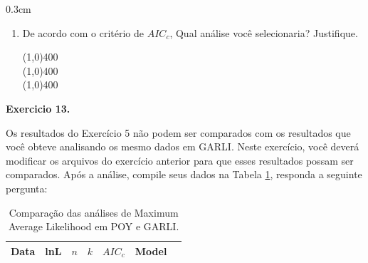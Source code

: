 \begin{refsection}
\begin {myindentpar}{0.3cm}
\begin{enumerate}[\itshape 1.]

	\item{De acordo com o critério de $AIC_{c}$, Qual análise você selecionaria? Justifique.}

\begin{center}
\line(1,0){400}\\
\line(1,0){400}\\
\line(1,0){400}\\
\end{center}

\end{enumerate}
\end{myindentpar}



\begin{blackBlock}{\textbf{Exercicio 13.}}\label{tut13:ex:13.6}

Os resultados do Exercício 5 não podem ser comparados com os resultados que você obteve analisando os mesmo dados em GARLI. Neste exercício, você deverá modificar os arquivos do exercício anterior para que esses resultados possam ser comparados. Após a análise, compile seus dados na Tabela \ref{tut13:ex:13.6}, responda a seguinte pergunta:

\end{blackBlock}


\pagestyle{fancy}
\begin{center}

\begin{longtable}{|l|>{\centering}m{2cm}|>{\centering}m{1cm}|c|>{\centering}m{2cm}|>{\centering}m{2cm} |@{}m{0pt}@{}}
\caption[Análise sob Maximum Average Likelihood comparado com GARLI.]{Comparação das análises de Maximum Average Likelihood em POY e GARLI.} \label{tut13:ex:13.6} \\

\hline\hline  \multicolumn{1}{|c|}{\textbf{Data}} & \textbf{lnL}  & \textbf{$n$} & \textbf{$k$} & \textbf{$AIC_{c}$} & \textbf{Model} &\\
\endfirsthead


\end{longtable}
\end{center}
\end{refsection}
